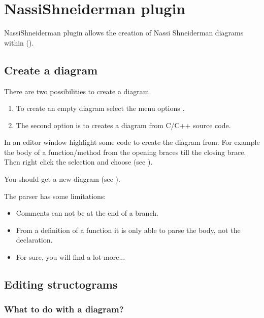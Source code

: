 \section{NassiShneiderman plugin}\label{sec:nassishneiderman}

NassiShneiderman plugin allows the creation of Nassi Shneiderman diagrams within \codeblocks (\cite{url:nassi}). 

\subsection{Create a diagram}

There are two possibilities to create a diagram.

\begin{enumerate}
\item To create an empty diagram select the menu options .
\item The second option is to creates a diagram from C/C++ source code. 
\end{enumerate}

In an editor window highlight some code to create the diagram from. For example the body of a function/method from the opening braces till the closing brace. Then right click the selection and choose  (see ). 


You should get a new diagram (see ).


The parser has some limitations:

\begin{itemize}
\item Comments can not be at the end of a branch.
\item From a definition of a function it is only able to parse the body, not the declaration.
\item For sure, you will find a lot more... 
\end{itemize}

\subsection{Editing structograms}
\subsubsection{What to do with a diagram?}

